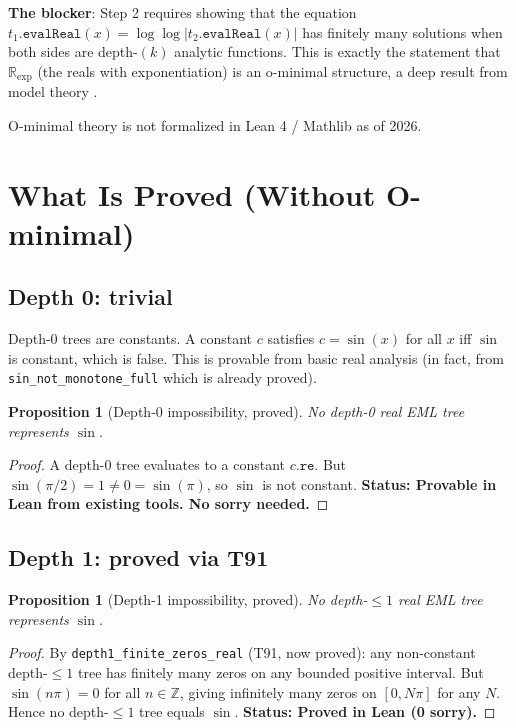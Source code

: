 \documentclass[12pt]{article}
\newtheorem{proposition}[theorem]{Proposition}
\theoremstyle{definition}
\begin{document}
\textbf{The blocker}: Step 2 requires showing that the equation
$t_1.\texttt{evalReal}(x) = \log\log|t_2.\texttt{evalReal}(x)|$ has finitely many solutions
when both sides are depth-$(k)$ analytic functions.
This is exactly the statement that $\mathbb{R}_{\exp}$ (the reals with exponentiation)
is an o-minimal structure, a deep result from model theory \cite{Wilkie1996}.

O-minimal theory is not formalized in Lean 4 / Mathlib as of 2026.

\section{What Is Proved (Without O-minimal)}

\subsection{Depth 0: trivial}

Depth-0 trees are constants. A constant $c$ satisfies $c = \sin(x)$ for all $x$
iff $\sin$ is constant, which is false. This is provable from basic real analysis
(in fact, from \texttt{sin\_not\_monotone\_full} which is already proved).

\begin{proposition}[Depth-0 impossibility, proved]
No depth-0 real EML tree represents $\sin$.
\end{proposition}
\begin{proof}
A depth-0 tree evaluates to a constant $c.\texttt{re}$.
But $\sin(\pi/2) = 1 \neq 0 = \sin(\pi)$, so $\sin$ is not constant.
\textbf{Status: Provable in Lean from existing tools. No sorry needed.}
\end{proof}

\subsection{Depth 1: proved via T91}

\begin{proposition}[Depth-1 impossibility, proved]
No depth-$\leq 1$ real EML tree represents $\sin$.
\end{proposition}
\begin{proof}
By \texttt{depth1\_finite\_zeros\_real} (T91, now proved):
any non-constant depth-$\leq 1$ tree has finitely many zeros on any bounded positive interval.
But $\sin(n\pi) = 0$ for all $n \in \mathbb{Z}$, giving infinitely many zeros on $[0, N\pi]$
for any $N$. Hence no depth-$\leq 1$ tree equals $\sin$.
\textbf{Status: Proved in Lean (0 sorry).}
\end{proof}
\end{document}

